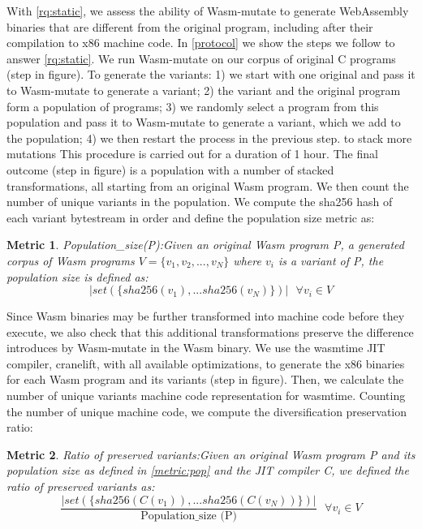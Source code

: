 \documentclass[sigplan,screen]{acmart}
\newcommand{\tool}{Wasm-mutate\xspace}
\newcommand{\wasm}{Wasm\xspace}
\newcommand{\Wasm}{WebAssembly\xspace}
\newtheorem{metric}{Metric}
\newcommand*\step[1]{
\noindent\tikz[baseline=(char.base)]{
        \node[shape=circle,text=black,draw=black, fill=white,inner sep=1.2pt] (char) {#1};}}
\begin{document}
With \ref{rq:static},
we assess the ability of \tool to generate \Wasm binaries that are different from the original program, including after their compilation to x86 machine code.
In \autoref{protocol} we show the steps we follow to answer \ref{rq:static}.
We run \tool on our corpus of \nProgramsRosetta{} original C programs (step \step{1} in figure). 
To generate the variants:
1) we start with one original and pass it to \tool to generate a variant;  
2) the variant and the original program form a population of programs; 
3) we randomly select a program from this population and pass it to \tool to generate a variant, which we add to the population; 
4) we then restart the process in the previous step. to stack more mutations 
This procedure is carried out for a duration of 1 hour.
The final outcome (step \step{2} in figure) is a population with a number of stacked transformations, all starting from an original \wasm program.
We then count the number of unique variants in the population.
We compute the sha256 hash of each variant bytestream in order and define the population size metric as: 


\begin{metric}{Population\_size(P):}\label{metric:pop}
Given an original \wasm program P, a generated corpus of \wasm programs $V=\{v_1, v_2, ..., v_N\}$ where $v_i$ is a variant of P, the population size is defined as:
$$
    | set(\{ sha256(v_1), ... sha256(v_N) \})|\text{ }\forall v_i \in V 
$$
\end{metric}


Since \wasm binaries may be further transformed into machine code before they execute, we also check that this additional transformations preserve the difference introduces by \tool in the \wasm binary. 
We use the wasmtime JIT compiler, cranelift, with all available optimizations, to generate the x86 binaries for each \wasm program and its variants  (step \step{3} in figure). 
Then, we calculate the number of unique variants machine code representation for wasmtime.
Counting the number of unique machine code, we compute the diversification preservation ratio: \\

\begin{metric}{Ratio of preserved variants:}\label{metric:preservation}
    Given an original \wasm program P and its population size as defined in \autoref{metric:pop} and the JIT compiler C, we defined the ratio of preserved variants as:
    $$
        \frac{ | set(\{ sha256(C(v_1)), ... sha256(C(v_N)) \})|}{ \text{Population\_size (P)}} \text{ }\forall v_i \in V 
    $$

    
\end{metric}
\end{document}
